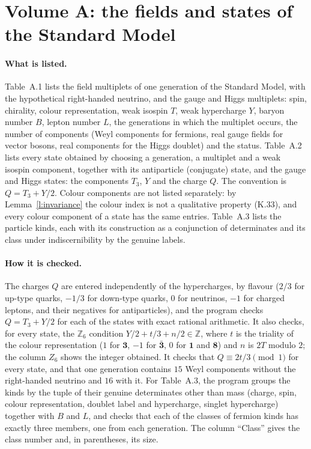 
\section{Volume A: the fields and states of the Standard Model}\label{app:a}

\paragraph{What is listed.} Table~A.1 lists the field multiplets of one generation of the Standard Model, with the hypothetical right-handed neutrino, and the gauge and Higgs multiplets: spin, chirality, colour representation, weak isospin $T$, weak hypercharge $Y$, baryon number $B$, lepton number $L$, the generations in which the multiplet occurs, the number of components (Weyl components for fermions, real gauge fields for vector bosons, real components for the Higgs doublet) and the status. Table~A.2 lists every state obtained by choosing a generation, a multiplet and a weak isospin component, together with its antiparticle (conjugate) state, and the gauge and Higgs states: the components $T_3$, $Y$ and the charge $Q$. The convention is $Q = T_3 + Y/2$. Colour components are not listed separately: by Lemma~\ref{l:invariance} the colour index is not a qualitative property (K.33), and every colour component of a state has the same entries. Table~A.3 lists the particle kinds, each with its construction as a conjunction of determinates and its class under indiscernibility by the genuine labels.

\paragraph{How it is checked.} The charges $Q$ are entered independently of the hypercharges, by flavour ($2/3$ for up-type quarks, $-1/3$ for down-type quarks, $0$ for neutrinos, $-1$ for charged leptons, and their negatives for antiparticles), and the program checks $Q = T_3 + Y/2$ for each of the \vvNQcheck{} states with exact rational arithmetic. It also checks, for every state, the $\mathbb{Z}_6$ condition $Y/2 + t/3 + n/2 \in \mathbb{Z}$, where $t$ is the triality of the colour representation ($1$ for $\mathbf 3$, $-1$ for $\bar{\mathbf 3}$, $0$ for $\mathbf 1$ and $\mathbf 8$) and $n$ is $2T$ modulo $2$; the column $Z_6$ shows the integer obtained. It checks that $Q \equiv 2t/3 \pmod 1$ for every state, and that one generation contains $15$ Weyl components without the right-handed neutrino and $16$ with it. For Table~A.3, the program groups the \vvNKinds{} kinds by the tuple of their genuine determinates other than mass (charge, spin, colour representation, doublet label and hypercharge, singlet hypercharge) together with $B$ and $L$, and checks that each of the \vvNFermClasses{} classes of fermion kinds has exactly three members, one from each generation. The column \enquote{Class} gives the class number and, in parentheses, its size.

